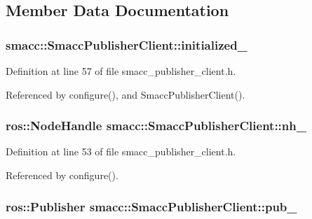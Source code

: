 \subsection{Member Data Documentation}
\subsubsection[{\texorpdfstring{initialized\+\_\+}{initialized_}}]{ smacc\+::\+Smacc\+Publisher\+Client\+::initialized\+\_\+\hspace{0.3cm}{\ttfamily [private]}}\hypertarget{classsmacc_1_1SmaccPublisherClient_affbfbaa739a6de9f118c551c56b09dfe}{}\label{classsmacc_1_1SmaccPublisherClient_affbfbaa739a6de9f118c551c56b09dfe}


Definition at line 57 of file smacc\+\_\+publisher\+\_\+client.\+h.



Referenced by configure(), and Smacc\+Publisher\+Client().

\subsubsection[{\texorpdfstring{nh\+\_\+}{nh_}}]{\setlength{\rightskip}{0pt plus 5cm}ros\+::\+Node\+Handle smacc\+::\+Smacc\+Publisher\+Client\+::nh\+\_\+\hspace{0.3cm}{\ttfamily [protected]}}\hypertarget{classsmacc_1_1SmaccPublisherClient_aaebda6a40634daf81c80add02f938ad3}{}\label{classsmacc_1_1SmaccPublisherClient_aaebda6a40634daf81c80add02f938ad3}


Definition at line 53 of file smacc\+\_\+publisher\+\_\+client.\+h.



Referenced by configure().

\subsubsection[{\texorpdfstring{pub\+\_\+}{pub_}}]{\setlength{\rightskip}{0pt plus 5cm}ros\+::\+Publisher smacc\+::\+Smacc\+Publisher\+Client\+::pub\+\_\+\hspace{0.3cm}{\ttfamily [protected]}}\hypertarget{classsmacc_1_1SmaccPublisherClient_a674fc5715c4983d093c8ae387232ae55}{}\label{classsmacc_1_1SmaccPublisherClient_a674fc5715c4983d093c8ae387232ae55}


